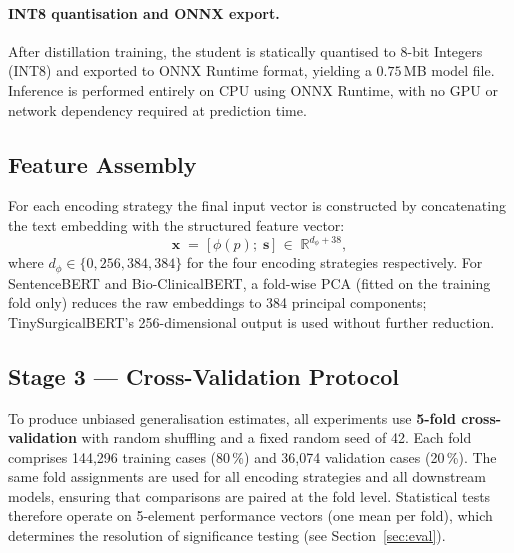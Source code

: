 \documentclass[3p]{elsarticle}
\begin{document}
\paragraph{INT8 quantisation and ONNX export.}
After distillation training, the student is statically quantised to 8-bit Integers (INT8) and exported to ONNX Runtime format, yielding a $0.75\,$MB model file. Inference is performed entirely on CPU using ONNX Runtime, with no GPU or network dependency required at prediction time.

\subsection{Feature Assembly}
\label{sec:assembly}

For each encoding strategy the final input vector is constructed by concatenating the text embedding with the structured feature vector:
\begin{equation}
  \mathbf{x} \;=\; \bigl[\,\phi(p);\;\mathbf{s}\,\bigr] \;\in\; \mathbb{R}^{d_\phi + 38},
  \label{eq:concat}
\end{equation}
where $d_\phi \in \{0, 256, 384, 384\}$ for the four encoding strategies respectively. For SentenceBERT and Bio-ClinicalBERT, a fold-wise PCA (fitted on the training fold only) reduces the raw embeddings to 384 principal components; TinySurgicalBERT's 256-dimensional output is used without further reduction.

\subsection{Stage 3 — Cross-Validation Protocol}
\label{sec:cv}

To produce unbiased generalisation estimates, all experiments use \textbf{5-fold cross-validation} with random shuffling and a fixed random seed of 42. Each fold comprises 144,296 training cases (80\,\%) and 36,074 validation cases (20\,\%). The same fold assignments are used for all encoding strategies and all downstream models, ensuring that comparisons are paired at the fold level. Statistical tests therefore operate on 5-element performance vectors (one mean per fold), which determines the resolution of significance testing (see Section~\ref{sec:eval}).

\end{document}
